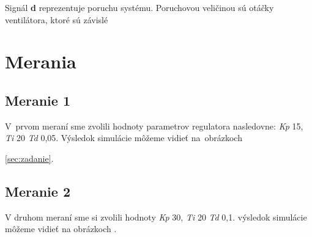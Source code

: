 \documentclass{article}
\begin{document}

Signál \textbf{d} reprezentuje poruchu systému. Poruchovou veličinou sú otáčky ventilátora, ktoré sú závislé

\section{Merania}
\label{sec:merania}

\subsection{Meranie 1}
\label{sec:meranie1}

V~prvom meraní sme zvolili hodnoty parametrov regulatora nasledovne: \textit{Kp} 15, \textit{Ti} 20 \textit{Td} 0,05. Výsledok simulácie môžeme vidieť na~obrázkoch


\clearpage

\ref{sec:zadanie}.

\clearpage

\subsection{Meranie 2}
\label{sec:meranie2}

V druhom meraní sme si zvolili hodnoty \textit{Kp} 30, \textit{Ti} 20 \textit{Td} 0,1. výsledok simulácie môžeme vidieť na obrázkoch  .
\end{document}
